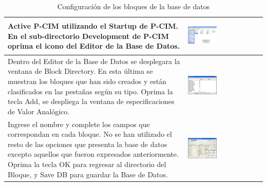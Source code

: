 \begin{table}[ht!]
\centering
\renewcommand*{\arraystretch}{0.01}
\begin{tabular}{*{2}{m{}}}
\hline
  Active P-CIM utilizando el Startup de P-CIM. En el sub-directorio Development 
  de P-CIM oprima el icono del Editor de la Base de Datos.
  &\begin{center}
    \includegraphics[width=0.4\textwidth]
      {Cap5-SCADA/images/startUp.jpeg}
  \end{center}\\
\hline
    Dentro del Editor de la Base de Datos se desplegara la ventana de Block 
    Directory. En esta última se muestran los bloques que han sido creados y
    están clasificados en las pestañas según su tipo.  Oprima la tecla Add, se 
    despliega la ventana de especificaciones de Valor Analógico.
    &\begin{center}
      \includegraphics[width=0.4\textwidth]
	{Cap5-SCADA/images/database.jpeg}
    \end{center}\\
\hline
    Ingrese el nombre y complete los campos que correspondan en cada bloque. 
    No se han utilizado el resto de las opciones que presenta la base de datos 
    excepto aquellos que fueron expresados anteriormente.
    Oprima la tecla OK para regresar al directorio del Bloque,
    y Save DB para guardar la Base de Datos.
    &\begin{center}
      \includegraphics[width=0.4\textwidth]
	{Cap5-SCADA/images/database1.jpeg}
    \end{center}\\
\hline
\end{tabular}
\caption{Configuración de los bloques de la base de datos}
\label{tab:confBlockDB}
\end{table}


